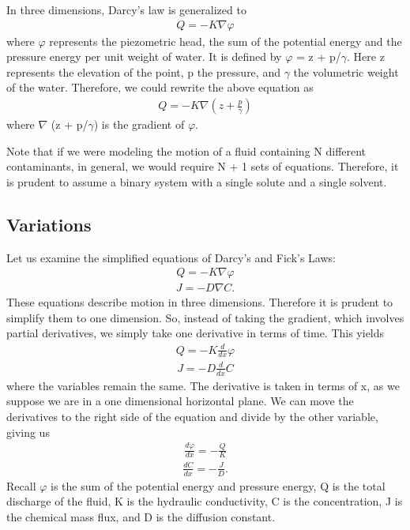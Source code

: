 \documentclass{article}
\begin{document}
In three dimensions, Darcy's law is generalized to 
    \begin{align}
        Q = -K\nabla \varphi
    \end{align}
\noindent where $\varphi$ represents the piezometric head, the sum of the potential energy and the pressure energy per unit weight of water. 
It is defined by $\varphi$ = z + p/$\gamma$.
Here z represents the elevation of the point, p the pressure, and $\gamma$ the volumetric weight of the water\cite{6}. 
Therefore, we could rewrite the above equation as 
    \begin{align}
        Q = -K\nabla(z + \frac{p}{\gamma})
    \end{align}
\noindent where $\nabla$ (z + p/$\gamma$) is the gradient of $\varphi$.

Note that if we were modeling the motion of a fluid containing N different contaminants, in general, we would require N + 1 sets of equations\cite{4}. 
Therefore, it is prudent to assume a binary system with a single solute and a single solvent.	

\subsection*{Variations}
Let us examine the simplified equations of Darcy's and Fick's Laws:
    \begin{align}
        Q = -K\nabla\varphi
    \end{align}
    \begin{align}
        J =- D\nabla C.
    \end{align}
These equations describe motion in three dimensions.
Therefore it is prudent to simplify them to one dimension. 
So, instead of taking the gradient, which involves partial derivatives, we simply take one derivative in terms of time.
This yields
    \begin{align}
        Q = -K\frac{d}{dx}\varphi
    \end{align}
    \begin{align}
        J =- D\frac{d}{dx}C
    \end{align}
\noindent where the variables remain the same. 
The derivative is taken in terms of x, as we suppose we are in a one dimensional horizontal plane. 
We can move the derivatives to the right side of the equation and divide by the other variable, giving us
    \begin{align}
        \frac{d\varphi}{dx} = -\frac{Q}{K}
    \end{align}
    \begin{align}
        \frac{dC}{dx} = -\frac{J}{D}.
    \end{align}
\noindent Recall $\varphi$ is the sum of the potential energy and pressure energy, Q is the total discharge of the fluid, K is the hydraulic conductivity, C is the concentration, J is the chemical mass flux, and D is the diffusion constant.
\end{document}
